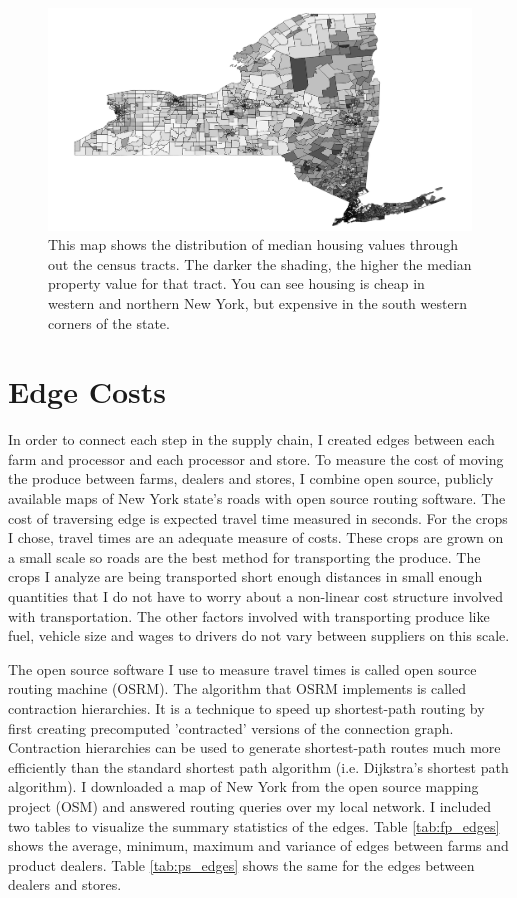 \documentclass{report}
\begin{document}
\begin{figure}
\centering
\begin{framed}
\includegraphics[scale=.50]{map_4}
\caption{This map shows the distribution of median housing values through out the census tracts. The darker the shading, the higher the median property value for that tract. You can see housing is cheap in western and northern New York, but expensive in the south western corners of the state.}
\label{fig:map_4}
\end{framed}
\end{figure}

\section{Edge Costs}

In order to connect each step in the supply chain, I created edges between each farm and processor and each processor and store. To measure the cost of moving the produce between farms, dealers and stores, I combine open source, publicly available maps of New York state's roads with open source routing software. The cost of traversing edge is expected travel time measured in seconds. For the crops I chose, travel times are an adequate measure of costs. These crops are grown on a small scale so roads are the best method for transporting the produce. The crops I analyze are being transported short enough distances in small enough quantities that I do not have to worry about a non-linear cost structure involved with transportation. The other factors involved with transporting produce like fuel, vehicle size and wages to drivers do not vary between suppliers on this scale. 

The open source software I use to measure travel times is called open source routing machine (OSRM). The algorithm that OSRM implements is called contraction hierarchies. It is a technique to speed up shortest-path routing by first creating precomputed 'contracted' versions of the connection graph. Contraction hierarchies can be used to generate shortest-path routes much more efficiently than the standard shortest path algorithm (i.e. Dijkstra's shortest path algorithm). I downloaded a map of New York from the open source mapping project (OSM) and answered routing queries over my local network. I included two tables to visualize the summary statistics of the edges. Table \ref{tab:fp_edges} shows the average, minimum, maximum and variance of edges between farms and product dealers. Table \ref{tab:ps_edges} shows the same for the edges between dealers and stores.
\end{document}

